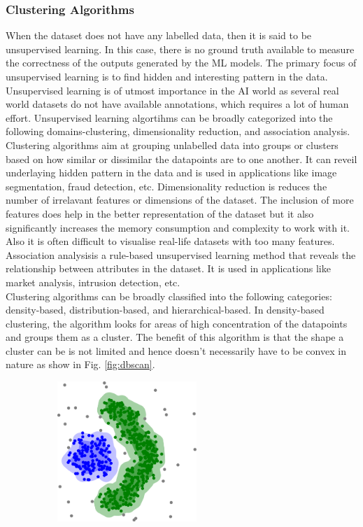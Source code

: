 {\subsubsection{Clustering Algorithms}
When the dataset does not have any labelled data, then it is said to be unsupervised learning. In this case, there is no ground truth available to measure the correctness of the outputs generated by the \ac{ML} models. The primary focus of unsupervised learning is to find hidden and interesting pattern in the data. Unsupervised learning is of utmost importance in the \ac{AI} world as several real world datasets do not have available annotations, which requires a lot of human effort. Unsupervised learning algortihms can be broadly categorized into the following domains-clustering, dimensionality reduction, and association analysis. Clustering algorithms aim at grouping unlabelled data into groups or clusters based on how similar or dissimilar the datapoints are to one another. It can reveil underlaying hidden pattern in the data and is used in applications like image segmentation, fraud detection, etc. Dimensionality reduction is reduces the number of irrelavant features or dimensions of the dataset. The inclusion of more features does help in the better representation of the dataset but it also significantly increases the memory consumption and complexity to work with it. Also it is often difficult to visualise real-life datasets with too many features. Association analysisis a rule-based unsupervised learning method that reveals the relationship between attributes in the dataset. It is used in applications like market analysis, intrusion detection, etc.\\
Clustering algorithms can be broadly classified into the following categories: density-based, distribution-based, and hierarchical-based. In density-based clustering, the algorithm looks for areas of high concentration of the datapoints and groups them as a cluster. The benefit of this algorithm is that the shape a cluster can be is not limited and hence doesn't necessarily have to be convex in nature as show in Fig. \ref*{fig:dbscan}.
\begin{figure}[t]
    \centering
    \includegraphics[width=200pt,height=150pt]{pictures/DBSCAN-density-data.png}

\end{figure}}
